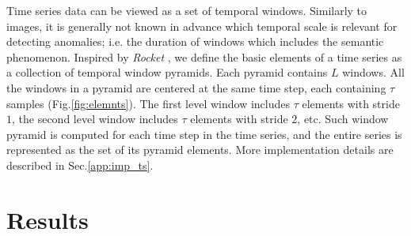 \documentclass{article}
\begin{document}
Time series data can be viewed as a set of temporal windows. Similarly to images, it is generally not known in advance which temporal scale is relevant for detecting anomalies; i.e. the duration of windows which includes the semantic phenomenon. Inspired by \textit{Rocket} \cite{dempster2020rocket}, we define the basic elements of a time series as a collection of temporal window pyramids. Each pyramid contains $L$ windows. All the windows in a pyramid are  centered at the same time step, each containing $\tau$ samples (Fig.\ref{fig:elemnts}). The first level window includes $\tau$ elements with stride $1$, the second level window includes $\tau$ elements with stride $2$, etc. Such window pyramid is computed for each time step in the time series, and the entire series is represented as the set of its pyramid elements. More implementation details are described in Sec.\ref{app:imp_ts}.


\section{Results}
\end{document}
